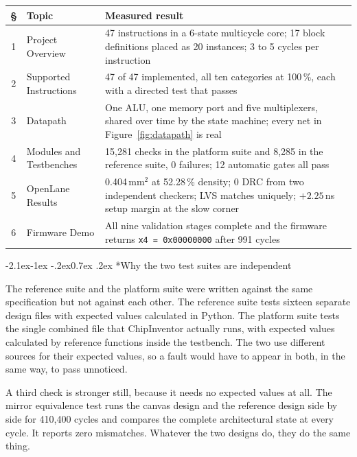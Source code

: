 \documentclass[11pt,a4paper]{article}
\makeatletter
\renewcommand\subsection{\@startsection{subsection}{2}{\z@}%
  {-2.1ex\@plus -1ex \@minus -.2ex}{0.7ex \@plus .2ex}%
  {\color{rvbldark}\normalfont\normalsize\bfseries}}
\newcommand{\hdr}[1]{\textbf{#1}}
\newcommand{\hrow}{\rowcolor{rvbltint}}
\makeatother
\begin{document}
\vspace{-2pt}
{\small
\begin{tabularx}{\linewidth}{c>{\raggedright\arraybackslash}p{3.3cm}X}
\toprule
\hrow \hdr{\S} & \hdr{Topic} & \hdr{Measured result} \\
\midrule
1 & Project Overview & 47 instructions in a 6-state multicycle core; 17 block
    definitions placed as 20 instances; 3 to 5 cycles per instruction \\
2 & Supported Instructions & 47 of 47 implemented, all ten categories at
    100\,\%, each with a directed test that passes \\
3 & Datapath & One ALU, one memory port and five multiplexers, shared over time
    by the state machine; every net in Figure~\ref{fig:datapath} is real \\
4 & Modules and Testbenches & 15{,}281 checks in the platform suite and 8{,}285
    in the reference suite, 0 failures; 12 automatic gates all pass \\
5 & OpenLane Results & 0.404\,mm$^2$ at 52.28\,\% density; 0 DRC from two
    independent checkers; LVS matches uniquely; $+2.25$\,ns setup margin at the
    slow corner \\
6 & Firmware Demo & All nine validation stages complete and the firmware returns
    \texttt{x4 = 0x00000000} after 991 cycles \\
\bottomrule
\end{tabularx}}

\vspace{6pt}
\subsection*{\color{rvbldark}Why the two test suites are independent}

The reference suite and the platform suite were written against the same
specification but not against each other. The reference suite tests sixteen separate design
files with expected values calculated in Python. The platform suite tests the single
combined file that ChipInventor actually runs, with expected values calculated by reference
functions inside the testbench. The two use different sources for their expected values, so
a fault would have to appear in both, in the same way, to pass unnoticed.

A third check is stronger still, because it needs no expected values at all. The mirror
equivalence test runs the canvas design and the reference design side by side for 410{,}400
cycles and compares the complete architectural state at every cycle. It reports zero
mismatches. Whatever the two designs do, they do the same thing.
\end{document}
